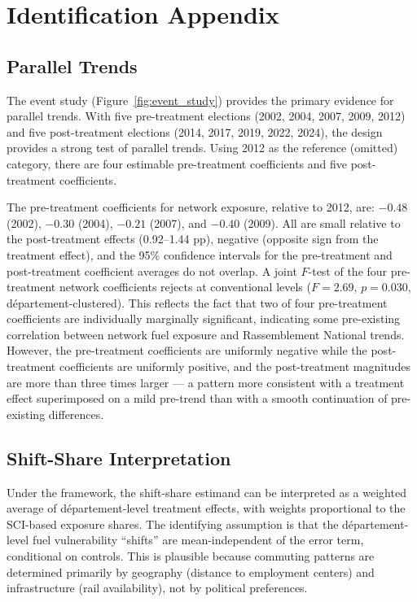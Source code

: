 \documentclass[12pt]{article}
\newcommand{\rn}{Rassemblement National}
\newcommand{\dept}{d\'{e}partement}
\begin{document}
\section{Identification Appendix}
\label{app:identification}

\subsection{Parallel Trends}

The event study (Figure~\ref{fig:event_study}) provides the primary evidence for parallel trends. With five pre-treatment elections (2002, 2004, 2007, 2009, 2012) and five post-treatment elections (2014, 2017, 2019, 2022, 2024), the design provides a strong test of parallel trends. Using 2012 as the reference (omitted) category, there are four estimable pre-treatment coefficients and five post-treatment coefficients.

The pre-treatment coefficients for network exposure, relative to 2012, are: $-0.48$ (2002), $-0.30$ (2004), $-0.21$ (2007), and $-0.40$ (2009). All are small relative to the post-treatment effects (0.92--1.44 pp), negative (opposite sign from the treatment effect), and the 95\% confidence intervals for the pre-treatment and post-treatment coefficient averages do not overlap. A joint $F$-test of the four pre-treatment network coefficients rejects at conventional levels ($F = 2.69$, $p = 0.030$, \dept{}-clustered). This reflects the fact that two of four pre-treatment coefficients are individually marginally significant, indicating some pre-existing correlation between network fuel exposure and \rn{} trends. However, the pre-treatment coefficients are uniformly negative while the post-treatment coefficients are uniformly positive, and the post-treatment magnitudes are more than three times larger --- a pattern more consistent with a treatment effect superimposed on a mild pre-trend than with a smooth continuation of pre-existing differences.

\subsection{Shift-Share Interpretation}

Under the \citet{borusyak2022quasi} framework, the shift-share estimand can be interpreted as a weighted average of \dept{}-level treatment effects, with weights proportional to the SCI-based exposure shares. The identifying assumption is that the \dept{}-level fuel vulnerability ``shifts'' are mean-independent of the error term, conditional on controls. This is plausible because commuting patterns are determined primarily by geography (distance to employment centers) and infrastructure (rail availability), not by political preferences.
\end{document}
